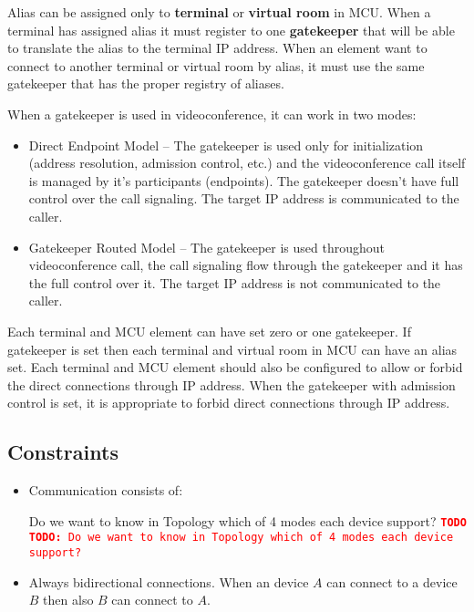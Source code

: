 \documentclass[a4paper]{report}
\newcommand{\TODO}[1]{%
\def\empty{}%
\def\prvniparametr{#1}%
\ifx\prvniparametr\empty%
\begingroup\tt\textcolor{red}{\noindent\textbf{TODO}}\endgroup
\else%
\begingroup\tt\textcolor{red}{\noindent\textbf{TODO:}\ #1}\endgroup
\fi%
}
\begin{document}
Alias can be assigned only to \textbf{terminal} or \textbf{virtual room} in MCU. When a terminal has assigned alias it must register to one \textbf{gatekeeper} that will be able to translate the alias to the terminal IP address. When an element want to connect to another terminal or virtual room by alias, it must use the same gatekeeper that has the proper registry of aliases.

When a gatekeeper is used in videoconference, it can work in two modes:
\begin{itemize}
\item Direct Endpoint Model -- The gatekeeper is used only for initialization (address resolution, admission control, etc.) and the videoconference call itself is managed by it's participants (endpoints). The gatekeeper doesn't have full control over the call signaling. The target IP address is communicated to the caller.
\item Gatekeeper Routed Model -- The gatekeeper is used throughout videoconference call, the call signaling flow through the gatekeeper and it has the full control over it. The target IP address is not communicated to the caller.
\end{itemize}

Each terminal and MCU element can have set zero or one gatekeeper. If gatekeeper is set then each terminal and virtual room in MCU can have an alias set. Each terminal and MCU element should also be configured to allow or forbid the direct connections through IP address. When the gatekeeper with admission control is set, it is appropriate to forbid direct connections through IP address.

\subsection{Constraints}

\begin{itemize}

\item Communication consists of:
\TODO{Do we want to know in Topology which of 4 modes each device support?}

\item Always bidirectional connections. When an device $A$ can connect to a device $B$ then also $B$ can connect to $A$.

\end{itemize}
\end{document}
